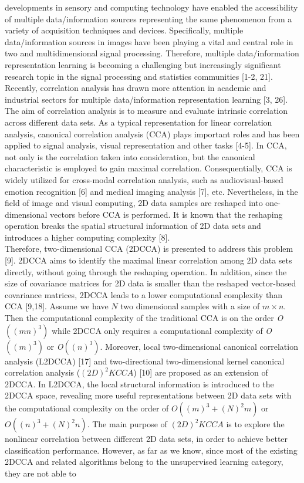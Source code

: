 \documentclass[journal]{IEEEtran}
\begin{document}
 developments in sensory and computing technology have enabled the accessibility of multiple data/information sources representing the same phenomenon from a variety of acquisition techniques and devices. Specifically, multiple data/information sources in images have been playing a vital and central role in two and multidimensional signal processing. Therefore, multiple data/information representation learning is becoming a challenging but increasingly significant research topic in the signal processing and statistics communities [1-2, 21].\\\indent Recently, correlation analysis has drawn more attention in academic and industrial sectors for multiple data/information representation learning [3, 26]. The aim of correlation analysis is to measure and evaluate intrinsic correlation across different data sets. As a typical representation for linear correlation analysis, canonical correlation analysis (CCA) plays important roles and has been applied to signal analysis, visual representation and other tasks [4-5]. In CCA, not only is the correlation taken into consideration, but the canonical characteristic is employed to gain maximal correlation. Consequentially, CCA is widely utilized for cross-modal correlation analysis, such as audiovisual-based emotion recognition [6] and medical imaging analysis [7], etc. Nevertheless, in the field of image and visual computing, 2D data samples are reshaped into one-dimensional vectors before CCA is performed. It is known that the reshaping operation breaks the spatial structural information of 2D data sets and introduces a higher computing complexity [8].\\\indent Therefore, two-dimensional CCA (2DCCA) is presented to address this problem [9]. 2DCCA aims to identify the maximal linear correlation among 2D data sets directly, without going through the reshaping operation. In addition, since the size of covariance matrices for 2D data is smaller than the reshaped vector-based covariance matrices, 2DCCA leads to a lower computational complexity than CCA [9,18]. Assume we have $N$ two dimensional samples with a size of $m \times n$. Then the computational complexity of the traditional CCA is on the order \emph{O$((mn)^{3})$} while 2DCCA only requires a computational complexity of \emph{O$((m)^{3})$} or \emph{O$((n)^{3})$}. Moreover, local two-dimensional canonical correlation analysis (L2DCCA) [17] and two-directional two-dimensional kernel canonical correlation analysis ($(2D)^2KCCA$) [10] are proposed as an extension of 2DCCA. In L2DCCA, the local structural information is introduced to the 2DCCA space, revealing more useful representations between 2D data sets with the computational complexity on the order of \emph{$O((m)^{3}+(N)^{2}m)$} or \emph{$O((n)^{3}+(N)^{2}n)$}. The main purpose of $(2D)^2KCCA$ is to explore the nonlinear correlation between different 2D data sets, in order to achieve better classification performance. However, as far as we know, since most of the existing 2DCCA and related algorithms belong to the unsupervised learning category, they are not able to 
\end{document}
